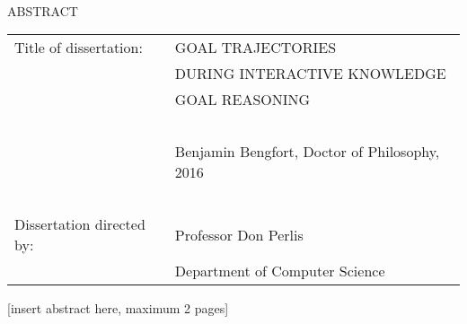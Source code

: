 
\hbox{\ }

\renewcommand{\baselinestretch}{1}
\small \normalsize

\begin{center}
\large{{ABSTRACT}}

\vspace{3em}

\end{center}
\hspace{-.15in}
\begin{tabular}{ll}
Title of dissertation:    & {\large  GOAL TRAJECTORIES }\\
&				      {\large  DURING INTERACTIVE KNOWLEDGE} \\
&				      {\large  GOAL REASONING} \\
\ \\
&                          {\large  Benjamin Bengfort, Doctor of Philosophy, 2016} \\
\ \\
Dissertation directed by: & {\large  Professor Don Perlis} \\
&  				{\large	 Department of Computer Science } \\
\end{tabular}

\vspace{3em}

\renewcommand{\baselinestretch}{2}
\large \normalsize

[insert abstract here, maximum 2 pages]
